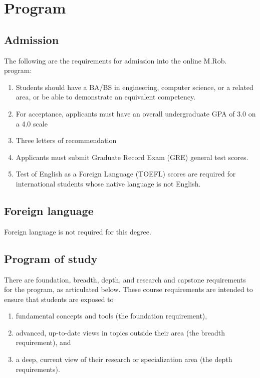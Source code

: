 \documentclass[11pt,letterpaper]{article}
\begin{document}
\section{Program}
\subsection{Admission}

The following are the requirements for admission into the online
M.Rob. program:
\begin{enumerate}
\item Students should have a BA/BS in engineering, computer
  science, or a related area, or be able to demonstrate an equivalent
  competency.
\item For acceptance, applicants must have an overall undergraduate GPA of 3.0 on a 4.0 scale
\item Three letters of recommendation
\item Applicants must submit Graduate Record Exam (GRE) general test scores.
\item Test of English as a Foreign Language (TOEFL) scores are
  required for international students whose native language is not
  English.
\end{enumerate}

\subsection{Foreign language}

Foreign language is not required for this degree.

\subsection{Program of study}

There are foundation, breadth, depth, and research and capstone
requirements for the program, as articulated below. These course
requirements are intended to ensure that students are exposed to
\begin{enumerate}
\item fundamental concepts and tools (the foundation requirement), 
\item advanced, up-to-date views in topics outside their area (the breadth 
   requirement), and
\item a deep, current view of their research or
   specialization area (the depth requirements).
 \end{enumerate}
 
\end{document}
